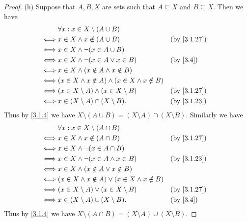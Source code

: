 \begin{proof}{(h)}
	Suppose that \(A, B, X\) are sets such that \(A \subseteq X\) and \(B \subseteq X\).
	Then we have
	\begin{align*}
		     & \forall x : x \in X \setminus (A \cup B)                                     \\
		\iff & x \in X \land x \notin (A \cup B)                           &  & \by{3.1.27} \\
		\iff & x \in X \land \lnot (x \in A \cup B)                                         \\
		\iff & x \in X \land \lnot (x \in A \lor x \in B)                  &  & \by{3.4}    \\
		\iff & x \in X \land (x \notin A \land x \notin B)                                  \\
		\iff & (x \in X \land x \notin A) \land (x \in X \land x \notin B)                  \\
		\iff & (x \in X \setminus A) \land (x \in X \setminus B)           &  & \by{3.1.27} \\
		\iff & x \in (X \setminus A) \cap (X \setminus B).                 &  & \by{3.1.23}
	\end{align*}
	Thus by \cref{3.1.4} we have \(X \setminus (A \cup B) = (X \setminus A) \cap (X \setminus B)\).
	Similarly we have
	\begin{align*}
		     & \forall x : x \in X \setminus (A \cap B)                                    \\
		\iff & x \in X \land x \notin (A \cap B)                          &  & \by{3.1.27} \\
		\iff & x \in X \land \lnot (x \in A \cap B)                                        \\
		\iff & x \in X \land \lnot (x \in A \land x \in B)                &  & \by{3.1.23} \\
		\iff & x \in X \land (x \notin A \lor x \notin B)                                  \\
		\iff & (x \in X \land x \notin A) \lor (x \in X \land x \notin B)                  \\
		\iff & (x \in X \setminus A) \lor (x \in X \setminus B)           &  & \by{3.1.27} \\
		\iff & x \in (X \setminus A) \cup (X \setminus B).                &  & \by{3.4}
	\end{align*}
	Thus by \cref{3.1.4} we have \(X \setminus (A \cap B) = (X \setminus A) \cup (X \setminus B)\).
\end{proof}

